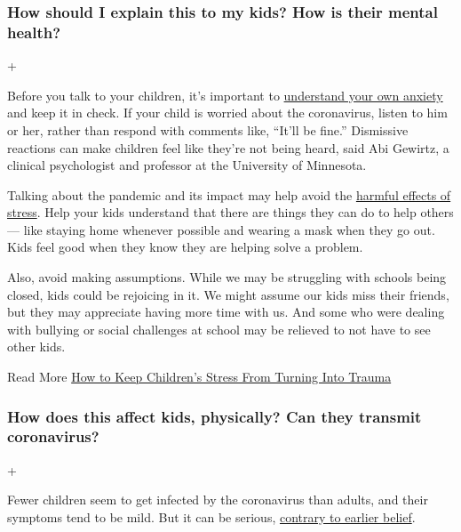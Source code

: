 \hypertarget{how-should-i-explain-this-to-my-kids-how-is-their-mental-health}{%
\subsubsection{How should I explain this to my kids? How is their mental
health?}\label{how-should-i-explain-this-to-my-kids-how-is-their-mental-health}}

+

Before you talk to your children, it's important to
\href{https://www.nytimes.com/2020/03/17/parenting/coronavirus-kids-talk.html}{understand
your own anxiety} and keep it in check. If your child is worried about
the coronavirus, listen to him or her, rather than respond with comments
like, ``It'll be fine.'' Dismissive reactions can make children feel
like they're not being heard, said Abi Gewirtz, a clinical psychologist
and professor at the University of Minnesota.

Talking about the pandemic and its impact may help avoid the
\href{https://www.nytimes.com/2020/05/20/us/coronavirus-young-people-emotional-toll.html}{harmful
effects of stress}. Help your kids understand that there are things they
can do to help others --- like staying home whenever possible and
wearing a mask when they go out. Kids feel good when they know they are
helping solve a problem.

Also, avoid making assumptions. While we may be struggling with schools
being closed, kids could be rejoicing in it. We might assume our kids
miss their friends, but they may appreciate having more time with us.
And some who were dealing with bullying or social challenges at school
may be relieved to not have to see other kids.

 Read More
\href{https://www.nytimes.com/2020/05/07/well/family/coronavirus-children-stress-parents.html}{How
to Keep Children's Stress From Turning Into Trauma}

\hypertarget{how-does-this-affect-kids-physically-can-they-transmit-coronavirus}{%
\subsubsection{How does this affect kids, physically? Can they transmit
coronavirus?}\label{how-does-this-affect-kids-physically-can-they-transmit-coronavirus}}

+

Fewer children seem to get infected by the coronavirus than adults, and
their symptoms tend to be mild. But it can be serious,
\href{https://www.nytimes.com/2020/05/12/well/family/coronavirus-children-covid-19.html}{contrary
to earlier belief}.

